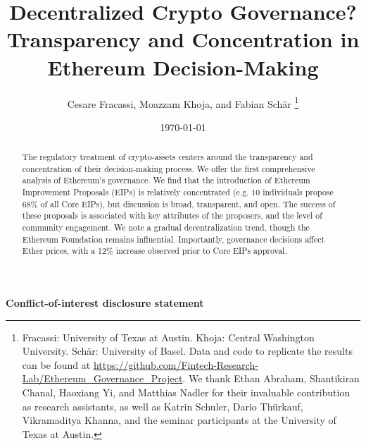 \documentclass[No]{AEA}
\begin{document}
\doublespacing

\title{Decentralized Crypto Governance? \\ Transparency and Concentration in Ethereum Decision-Making}
\author{Cesare Fracassi, Moazzam Khoja, and Fabian Sch\"{a}r \thanks{Fracassi: University of Texas at Austin. Khoja: Central Washington University. Sch\"{a}r: University of Basel. Data and code to replicate the results can be found at \url{https://github.com/Fintech-Research-Lab/Ethereum_Governance_Project}. We thank Ethan Abraham, Shantikiran Chanal, Haoxiang Yi, and Matthias Nadler for their invaluable contribution as research assistants, as well as Katrin Schuler, Dario Thürkauf, Vikramaditya Khanna, and the seminar participants at the University of Texas at Austin.}}
\date{\today}
\JEL{}
\Keywords{}



    
\begin{abstract}
The regulatory treatment of crypto-assets centers around the transparency and concentration of their decision-making process. We offer the first comprehensive analysis of Ethereum’s governance. We find that the introduction of Ethereum Improvement Proposals (EIPs) is relatively concentrated (e.g. 10 individuals propose 68\% of all Core EIPs), but discussion is broad, transparent, and open. The success of these proposals is associated with key attributes of the proposers, and the level of community engagement. We note a gradual decentralization trend, though the Ethereum Foundation remains influential. Importantly, governance decisions affect Ether prices, with a 12\% increase observed prior to Core EIPs approval.
\end{abstract}


\maketitle
{}


\clearpage

\begin{center}
    \textbf{Conflict-of-interest disclosure statement}
\end{center}
\end{document}
